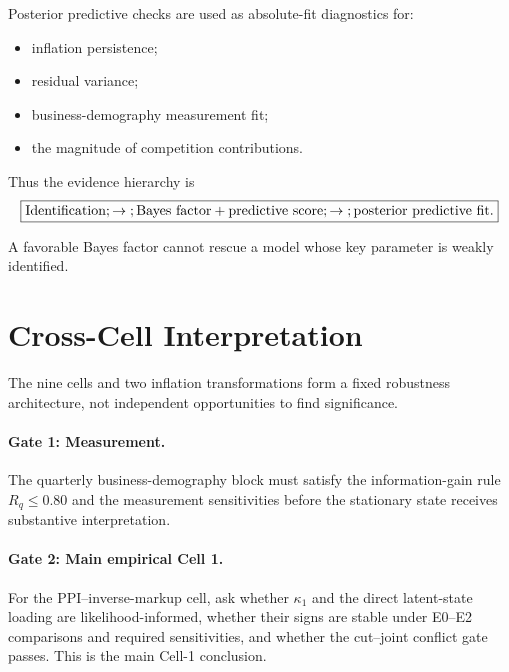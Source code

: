 \documentclass[11pt]{article}
\begin{document}
Posterior predictive checks are used as absolute-fit diagnostics for:
\begin{itemize}
\item inflation persistence;
\item residual variance;
\item business-demography measurement fit;
\item the magnitude of competition contributions.
\end{itemize}

Thus the evidence hierarchy is
\begin{equation}
\boxed{
\text{Identification}
\\;\rightarrow\\;
\text{Bayes factor}
+
\text{predictive score}
\\;\rightarrow\\;
\text{posterior predictive fit}.
}
\end{equation}

A favorable Bayes factor cannot rescue a model whose key parameter is weakly identified.

\section{Cross-Cell Interpretation}

The nine cells and two inflation transformations form a fixed robustness architecture, not independent opportunities to find significance.

\paragraph{Gate 1: Measurement.}
The quarterly business-demography block must satisfy the information-gain rule $R_q\le0.80$ and the measurement sensitivities before the stationary state receives substantive interpretation.

\paragraph{Gate 2: Main empirical Cell 1.}
For the PPI--inverse-markup cell, ask whether $\kappa_1$ and the direct latent-state loading are likelihood-informed, whether their signs are stable under E0--E2 comparisons and required sensitivities, and whether the cut--joint conflict gate passes. This is the main Cell-1 conclusion.
\end{document}
